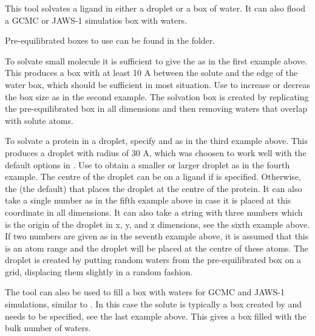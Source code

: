 \documentclass[letterpaper,10pt,english]{sphinxmanual}
\begin{document}

This tool solvates a ligand in either a droplet or a box of water. It can also flood a GCMC or JAWS-1 simulatios box with waters.

Pre-equilibrated boxes to use can be found in the  folder.

To solvate small molecule it is sufficient to give the  as in the first example above. This produces a box with at least 10 A between the solute and the edge of the water box, which should be sufficient in most situation. Use  to increase or decreas the box size as in the second example. The solvation box is created by replicating the pre-equilibrated box in all dimensions and then removing waters that overlap with solute atoms.

To solvate a protein in a droplet, specify  and  as in the third example above. This produces a droplet with radius of 30 A, which was choosen to work well with the default options in . Use  to obtain a smaller or larger droplet as in the fourth example. The centre of the droplet can be on a ligand if  is specified. Otherwise, the  (the default) that places the droplet at the centre of the protein. It can also take a single number as in the fifth example above in case it is placed at this coordinate in all dimensions. It can also take a string with three numbers which is the origin of the droplet in x, y, and z dimensions, see the sixth example above. If two numbers are given as in the seventh example above, it is assumed that this is an atom range and the droplet will be placed at the centre of these atoms. The droplet is created by putting random waters from the pre-equilibrated box on a grid, displacing them slightly in a random fashion.

The tool can also be used to fill a box with waters for GCMC and JAWS-1 simulations, similar to . In this case the solute is typically a box created by  and  needs to be specified, see the last example above. This gives a box filled with the bulk number of waters.
\end{document}
